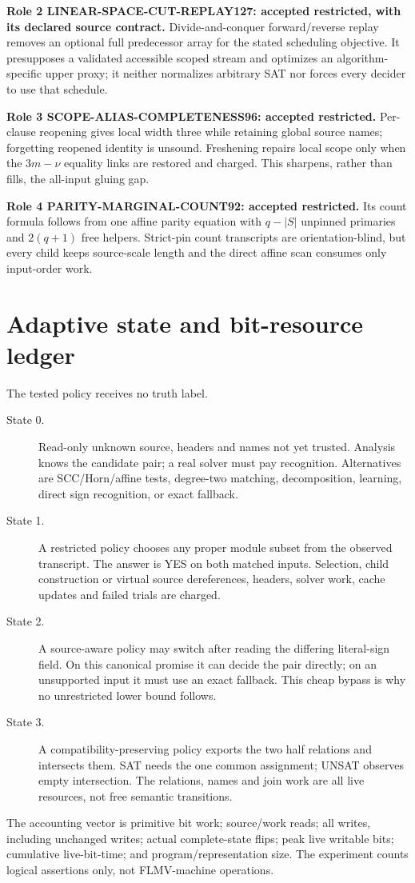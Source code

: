 \documentclass[11pt]{article}
\begin{document}
\textbf{Role 2 LINEAR-SPACE-CUT-REPLAY127: accepted restricted, with its
declared source contract.}  Divide-and-conquer forward/reverse replay removes
an optional full predecessor array for the stated scheduling objective.
It presupposes a validated accessible scoped stream and optimizes an
algorithm-specific upper proxy; it neither normalizes arbitrary SAT nor
forces every decider to use that schedule.

\textbf{Role 3 SCOPE-ALIAS-COMPLETENESS96: accepted restricted.}
Per-clause reopening gives local width three while retaining global source
names; forgetting reopened identity is unsound.  Freshening repairs local
scope only when the \(3m-\nu\) equality links are restored and charged.
This sharpens, rather than fills, the all-input gluing gap.

\textbf{Role 4 PARITY-MARGINAL-COUNT92: accepted restricted.}
Its count formula follows from one affine parity equation with
\(q-|S|\) unpinned primaries and \(2(q+1)\) free helpers.  Strict-pin count
transcripts are orientation-blind, but every child keeps source-scale
length and the direct affine scan consumes only input-order work.

\section{Adaptive state and bit-resource ledger}
The tested policy receives no truth label.
\begin{description}
\item[State 0.] Read-only unknown source, headers and names not yet trusted.
Analysis knows the candidate pair; a real solver must pay recognition.
Alternatives are SCC/Horn/affine tests, degree-two matching, decomposition,
learning, direct sign recognition, or exact fallback.
\item[State 1.] A restricted policy chooses any proper module subset from
the observed transcript.  The answer is YES on both matched inputs.
Selection, child construction or virtual source dereferences, headers,
solver work, cache updates and failed trials are charged.
\item[State 2.] A source-aware policy may switch after reading the differing
literal-sign field.  On this canonical promise it can decide the pair
directly; on an unsupported input it must use an exact fallback.  This cheap
bypass is why no unrestricted lower bound follows.
\item[State 3.] A compatibility-preserving policy exports the two half
relations and intersects them.  SAT needs the one common assignment;
UNSAT observes empty intersection.  The relations, names and join work are
all live resources, not free semantic transitions.
\end{description}
The accounting vector is primitive bit work; source/work reads; all writes,
including unchanged writes; actual complete-state flips; peak live writable
bits; cumulative live-bit-time; and program/representation size.  The
experiment counts logical assertions only, not FLMV-machine operations.
\end{document}
